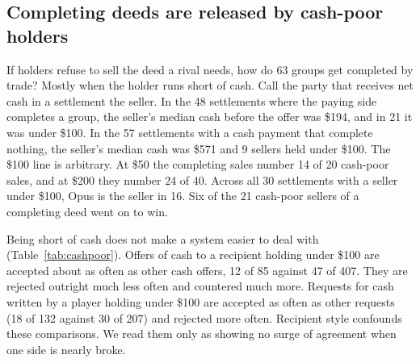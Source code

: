 


\subsection{Completing deeds are released by cash-poor holders}
\label{sec:cashpoor}

If holders refuse to sell the deed a rival needs, how do 63 groups get completed by trade? Mostly when the holder runs short of cash. Call the party that receives net cash in a settlement the seller. In the 48 settlements where the paying side completes a group, the seller's median cash before the offer was \$194, and in 21 it was under \$100. In the 57 settlements with a cash payment that complete nothing, the seller's median cash was \$571 and 9 sellers held under \$100. The \$100 line is arbitrary. At \$50 the completing sales number 14 of 20 cash-poor sales, and at \$200 they number 24 of 40. Across all 30 settlements with a seller under \$100, Opus is the seller in 16. Six of the 21 cash-poor sellers of a completing deed went on to win.

Being short of cash does not make a system easier to deal with (Table~\ref{tab:cashpoor}). Offers of cash to a recipient holding under \$100 are accepted about as often as other cash offers, 12 of 85 against 47 of 407. They are rejected outright much less often and countered much more. Requests for cash written by a player holding under \$100 are accepted as often as other requests (18 of 132 against 30 of 207) and rejected more often. Recipient style confounds these comparisons. We read them only as showing no surge of agreement when one side is nearly broke.

